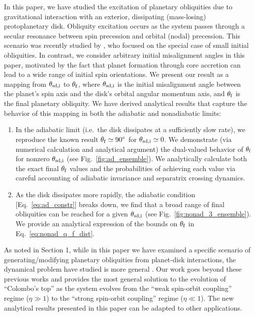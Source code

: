 In this paper, we have studied the excitation of planetary obliquities due to
gravitational interaction with an exterior, dissipating (mass-losing)
protoplanetary disk. Obliquity excitation occurs as the system passes through a
secular resonance between spin precession and orbital (nodal) precession. This
scenario was recently studied by \citet{millholland_disk}, who focused on the
special case of small initial obliquities.  In contrast, we consider arbitrary
initial misalignment angles in this paper, motivated by the fact that planet
formation through core accretion can lead to a wide range of initial spin
orientations.  We present our result as a mapping from $\theta_{\rm sd, i}$ to
$\theta_{\rm f}$, where $\theta_{\rm sd, i}$ is the initial misalignment angle
between the planet's spin axis and the disk's orbital angular momentum axis, and
$\theta_{\rm f}$ is the final planetary obliquity. We have derived analytical
results that capture the behavior of this mapping in both the adiabatic and
nonadiabatic limits:
\begin{enumerate}
    \item In the adiabatic limit (i.e.\ the disk dissipates at a
        sufficiently slow rate), we reproduce the known result $\theta_{\rm f}
        \simeq 90^\circ$ for $\theta_{\rm sd, i} \simeq 0$. We demonstrate (via
        numerical calculation and analytical argument) the dual-valued behavior
        of $\theta_{\rm f}$ for nonzero $\theta_{\rm sd, i}$ (see
        Fig.~\ref{fig:ad_ensemble}). We analytically calculate both the exact
        final $\theta_{\rm f}$ values and the probabilities of achieving each
        value via careful accounting of adiabatic invariance and separatrix
        crossing dynamics.
    \item As the disk dissipates more rapidly, the adiabatic condition
        [Eq.~\eqref{eq:ad_constr}] breaks down, we find that a broad range of
        final obliquities can be reached for a given $\theta_{\rm sd, i}$ (see
        Fig.~\ref{fig:nonad_3_ensemble}). We provide an analytical expression of
        the bounds on $\theta_{\rm f}$ in Eq.~\eqref{eq:nonad_q_f_dist}.
\end{enumerate}

As noted in Section 1, while in this paper we have examined a specific scenario
of generating/modifying planetary obliquities from planet-disk interactions, the
dynamical problem have studied is more general
\citep{colombo1966,peale1969,peale1974possible,ward1975tidal,henrard1987}. Our
work goes beyond these previous works and provides the most general solution to
the evolution of ``Colombo's top'' as the system evolves from the ``weak
spin-orbit coupling'' regime ($\eta\gg 1$) to the ``strong spin-orbit coupling''
regime ($\eta\ll 1$).  The new analytical results presented in this paper can be
adapted to other applications.

